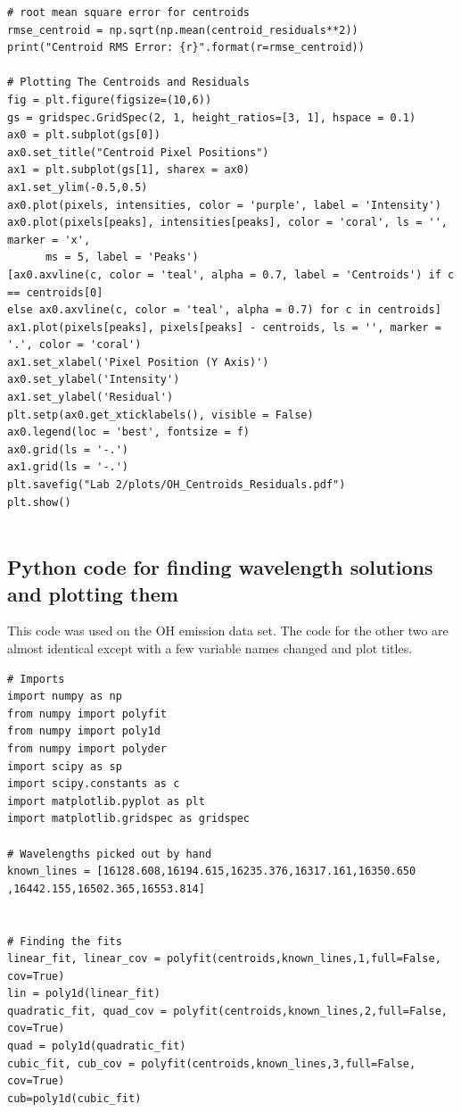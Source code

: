 \documentclass{article}
\begin{document}
\begin{appendices}
\begin{footnotesize}
\begin{verbatim}
# root mean square error for centroids
rmse_centroid = np.sqrt(np.mean(centroid_residuals**2))
print("Centroid RMS Error: {r}".format(r=rmse_centroid))

# Plotting The Centroids and Residuals
fig = plt.figure(figsize=(10,6))
gs = gridspec.GridSpec(2, 1, height_ratios=[3, 1], hspace = 0.1)
ax0 = plt.subplot(gs[0])
ax0.set_title("Centroid Pixel Positions")
ax1 = plt.subplot(gs[1], sharex = ax0)
ax1.set_ylim(-0.5,0.5)
ax0.plot(pixels, intensities, color = 'purple', label = 'Intensity')
ax0.plot(pixels[peaks], intensities[peaks], color = 'coral', ls = '', marker = 'x',
      ms = 5, label = 'Peaks')
[ax0.axvline(c, color = 'teal', alpha = 0.7, label = 'Centroids') if c == centroids[0]
else ax0.axvline(c, color = 'teal', alpha = 0.7) for c in centroids]
ax1.plot(pixels[peaks], pixels[peaks] - centroids, ls = '', marker = '.', color = 'coral')
ax1.set_xlabel('Pixel Position (Y Axis)')
ax0.set_ylabel('Intensity')
ax1.set_ylabel('Residual')
plt.setp(ax0.get_xticklabels(), visible = False)
ax0.legend(loc = 'best', fontsize = f)
ax0.grid(ls = '-.')
ax1.grid(ls = '-.')
plt.savefig("Lab 2/plots/OH_Centroids_Residuals.pdf")
plt.show()


\end{verbatim}
\end{footnotesize}
\subsection{Python code for finding wavelength solutions and plotting them}
This code was used on the OH emission data set. The code for the other two are almost identical except with a few variable names changed and plot titles. 
\begin{footnotesize}
\begin{verbatim}
# Imports 
import numpy as np
from numpy import polyfit
from numpy import poly1d
from numpy import polyder
import scipy as sp
import scipy.constants as c
import matplotlib.pyplot as plt
import matplotlib.gridspec as gridspec

# Wavelengths picked out by hand
known_lines = [16128.608,16194.615,16235.376,16317.161,16350.650
,16442.155,16502.365,16553.814]


# Finding the fits 
linear_fit, linear_cov = polyfit(centroids,known_lines,1,full=False, cov=True)
lin = poly1d(linear_fit)
quadratic_fit, quad_cov = polyfit(centroids,known_lines,2,full=False, cov=True)
quad = poly1d(quadratic_fit)
cubic_fit, cub_cov = polyfit(centroids,known_lines,3,full=False, cov=True)
cub=poly1d(cubic_fit)


\end{verbatim}
\end{footnotesize}
\end{appendices}
\end{document}
